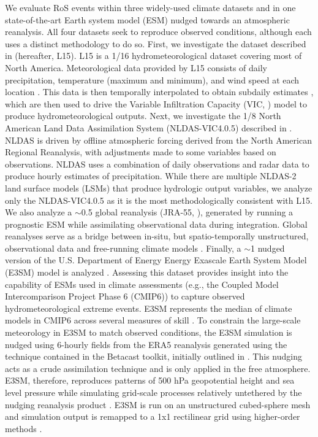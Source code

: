 \documentclass[nhess, manuscript]{copernicus}
\begin{document}
We evaluate RoS events within three widely-used climate datasets and in one state-of-the-art Earth system model (ESM) nudged towards an atmospheric reanalysis.
All four datasets seek to reproduce observed conditions, although each uses a distinct methodology to do so.
First, we investigate the dataset described in \citet{livneh2015spatially} (hereafter, L15).
L15 is a 1/16\degree{} hydrometeorological dataset covering most of North America.
Meteorological data provided by L15 consists of daily precipitation, temperature (maximum and minimum), and wind speed at each location \citep{henn2018an}.
This data is then temporally interpolated to obtain subdaily estimates \citep{bohn2013global}, which are then used to drive the Variable Infiltration Capacity (VIC, \citet{liang1994simple}) model to produce hydrometeorological outputs.
Next, we investigate the 1/8\degree{} North American Land Data Assimilation System (NLDAS-VIC4.0.5)  described in \citet{xia2012continental1}.
NLDAS is driven by offline atmospheric forcing derived from the North American Regional Reanalysis, with adjustments made to some variables based on observations.
NLDAS uses a combination of daily observations and radar data to produce hourly estimates of precipitation.
While there are multiple NLDAS-2 land surface models (LSMs) that produce hydrologic output variables, we analyze only the NLDAS-VIC4.0.5 as it is the most methodologically consistent with L15.
We also analyze a $\sim$0.5\degree{} global reanalysis (JRA-55, \citet{kobayashi2015jra55}), generated by running a prognostic ESM while assimilating observational data during integration.
Global reanalyses serve as a bridge between in-situ, but spatio-temporally unstructured, observational data and free-running climate models \citep{parker2016reanalyses}.
Finally, a $\sim$1\degree{} nudged version of the U.S. Department of Energy Energy Exascale Earth System Model (E3SM) model is analyzed \citep{zhang2022further}. Assessing this dataset provides insight into the capability of ESMs used in climate assessments (e.g., the Coupled Model Intercomparison Project Phase 6 (CMIP6)) to capture observed hydrometeorological extreme events.
E3SM represents the median of climate models in CMIP6 across several measures of skill \citep{Fasullo2020}.
To constrain the large-scale meteorology in E3SM to match observed conditions, the E3SM simulation is nudged using 6-hourly fields from the ERA5 reanalysis \citep{hersbach2020era5} generated using the technique contained in the Betacast toolkit, initially outlined in \citet{zarzycki2015experimental}.
This nudging acts as a crude assimilation technique and is only applied in the free atmosphere.
E3SM, therefore, reproduces patterns of 500 hPa geopotential height and sea level pressure while simulating grid-scale processes relatively untethered by the nudging reanalysis product \citep{sun2019impact}.
E3SM is run on an unstructured cubed-sphere mesh and simulation output is remapped to a 1\degree{}x1\degree{} rectilinear grid using higher-order methods \citep{hill2004architecture}.
\end{document}
